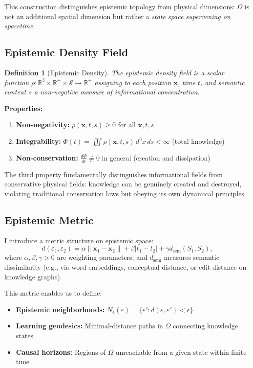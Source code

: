 \documentclass[12pt]{article}
\newtheorem{definition}[theorem]{Definition}
\begin{document}
This construction distinguishes epistemic topology from physical dimensions: $\Omega$ is not an additional spatial dimension but rather a \emph{state space supervening on spacetime}.

\subsection{Epistemic Density Field}

\begin{definition}[Epistemic Density]
The \emph{epistemic density field} is a scalar function $\rho: \mathbb{R}^3 \times \mathbb{R}^+ \times \mathcal{S} \to \mathbb{R}^+$ assigning to each position $\mathbf{x}$, time $t$, and semantic content $s$ a non-negative measure of informational concentration.
\end{definition}

\textbf{Properties:}
\begin{enumerate}
    \item \textbf{Non-negativity:} $\rho(\mathbf{x},t,s) \geq 0$ for all $\mathbf{x}, t, s$
    \item \textbf{Integrability:} $\Phi(t) = \iiint \rho(\mathbf{x},t,s)\, d^3x\, ds < \infty$ (total knowledge)
    \item \textbf{Non-conservation:} $\frac{d\Phi}{dt} \neq 0$ in general (creation and dissipation)
\end{enumerate}

The third property fundamentally distinguishes informational fields from conservative physical fields: knowledge can be genuinely created and destroyed, violating traditional conservation laws but obeying its own dynamical principles.

\subsection{Epistemic Metric}

I introduce a metric structure on epistemic space:
\begin{equation}
    d(\varepsilon_1, \varepsilon_2) = \alpha \|\mathbf{x}_1 - \mathbf{x}_2\| + \beta |t_1 - t_2| + \gamma d_{\text{sem}}(S_1, S_2),
    \label{eq:metric}
\end{equation}
where $\alpha, \beta, \gamma > 0$ are weighting parameters, and $d_{\text{sem}}$ measures semantic dissimilarity (e.g., via word embeddings, conceptual distance, or edit distance on knowledge graphs).

This metric enables us to define:
\begin{itemize}
    \item \textbf{Epistemic neighborhoods:} $N_\epsilon(\varepsilon) = \{\varepsilon' : d(\varepsilon, \varepsilon') < \epsilon\}$
    \item \textbf{Learning geodesics:} Minimal-distance paths in $\Omega$ connecting knowledge states
    \item \textbf{Causal horizons:} Regions of $\Omega$ unreachable from a given state within finite time
\end{itemize}
\end{document}
